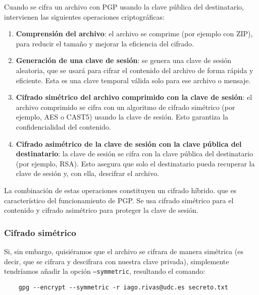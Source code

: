 Cuando se cifra un archivo con PGP usando la clave pública del destinatario, intervienen las siguientes operaciones criptográficas:
\begin{enumerate}
    \item \textbf{Comprensión del archivo}: el archivo se comprime (por ejemplo con ZIP), para reducir el tamaño y mejorar la eficiencia del cifrado.
    \item \textbf{Generación de una clave de sesión}: se genera una clave de sesión aleatoria, que se usará para cifrar el contenido del archivo de forma rápida y eficiente. Esta es una clave temporal válida solo para ese archivo o mensaje.
    \item \textbf{Cifrado simétrico del archivo comprimido con la clave de sesión}: el archivo comprimido se cifra con un algoritmo de cifrado simétrico (por ejemplo, AES o CAST5) usando la clave de sesión. Esto garantiza la confidencialidad del contenido.
    \item \textbf{Cifrado asimétrico de la clave de sesión con la clave pública del destinatario}: la clave de sesión se cifra con la clave pública del destinatario (por ejemplo, RSA). Esto asegura que solo el destinatario pueda recuperar la clave de sesión y, con ella, descifrar el archivo.
\end{enumerate}

La combinación de estas operaciones constituyen un cifrado híbrido. que es característico del funcionamiento de PGP. Se usa cifrado simétrico para el contenido y cifrado asimétrico para proteger la clave de sesión.

\subsubsection{Cifrado simétrico}

Si, sin embargo, quisiéramos que el archivo se cifrara de manera simétrica (es decir, que se cifrara y descifrara con nuestra clave privada), simplemente tendríamos añadir la opción \texttt{--symmetric}, resultando el comando:

\begin{verbatim}
    gpg --encrypt --symmetric -r iago.rivas@udc.es secreto.txt
\end{verbatim}

